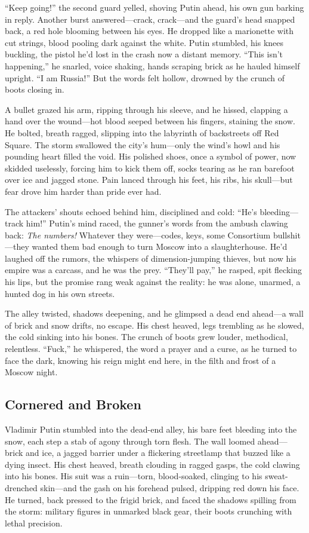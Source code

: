 \documentclass[12pt]{book}
\begin{document}
“Keep going!” the second guard yelled, shoving Putin ahead, his own gun barking in reply. Another burst answered—crack, crack—and the guard’s head snapped back, a red hole blooming between his eyes. He dropped like a marionette with cut strings, blood pooling dark against the white. Putin stumbled, his knees buckling, the pistol he’d lost in the crash now a distant memory. “This isn’t happening,” he snarled, voice shaking, hands scraping brick as he hauled himself upright. “I am Russia!” But the words felt hollow, drowned by the crunch of boots closing in.

A bullet grazed his arm, ripping through his sleeve, and he hissed, clapping a hand over the wound—hot blood seeped between his fingers, staining the snow. He bolted, breath ragged, slipping into the labyrinth of backstreets off Red Square. The storm swallowed the city’s hum—only the wind’s howl and his pounding heart filled the void. His polished shoes, once a symbol of power, now skidded uselessly, forcing him to kick them off, socks tearing as he ran barefoot over ice and jagged stone. Pain lanced through his feet, his ribs, his skull—but fear drove him harder than pride ever had.

The attackers’ shouts echoed behind him, disciplined and cold: “He’s bleeding—track him!” Putin’s mind raced, the gunner’s words from the ambush clawing back: \textit{The numbers!} Whatever they were—codes, keys, some Consortium bullshit—they wanted them bad enough to turn Moscow into a slaughterhouse. He’d laughed off the rumors, the whispers of dimension-jumping thieves, but now his empire was a carcass, and he was the prey. “They’ll pay,” he rasped, spit flecking his lips, but the promise rang weak against the reality: he was alone, unarmed, a hunted dog in his own streets.

The alley twisted, shadows deepening, and he glimpsed a dead end ahead—a wall of brick and snow drifts, no escape. His chest heaved, legs trembling as he slowed, the cold sinking into his bones. The crunch of boots grew louder, methodical, relentless. “Fuck,” he whispered, the word a prayer and a curse, as he turned to face the dark, knowing his reign might end here, in the filth and frost of a Moscow night.

\subsection{Cornered and Broken}

Vladimir Putin stumbled into the dead-end alley, his bare feet bleeding into the snow, each step a stab of agony through torn flesh. The wall loomed ahead—brick and ice, a jagged barrier under a flickering streetlamp that buzzed like a dying insect. His chest heaved, breath clouding in ragged gasps, the cold clawing into his bones. His suit was a ruin—torn, blood-soaked, clinging to his sweat-drenched skin—and the gash on his forehead pulsed, dripping red down his face. He turned, back pressed to the frigid brick, and faced the shadows spilling from the storm: military figures in unmarked black gear, their boots crunching with lethal precision.
\end{document}
